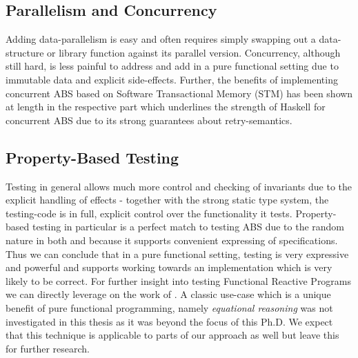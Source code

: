 %
%
%	
%	

\subsection{Parallelism and Concurrency}
Adding data-parallelism is easy and often requires simply swapping out a data-structure or library function against its parallel version. Concurrency, although still hard, is less painful to address and add in a pure functional setting due to immutable data and explicit side-effects. Further, the benefits of implementing concurrent ABS based on Software Transactional Memory (STM) has been shown at length in the respective part which underlines the strength of Haskell for concurrent ABS due to its strong guarantees about retry-semantics. 

\subsection{Property-Based Testing}
Testing in general allows much more control and checking of invariants due to the explicit handling of effects - together with the strong static type system, the testing-code is in full, explicit control over the functionality it tests. Property-based testing in particular is a perfect match to testing ABS due to the random nature in both and because it supports convenient expressing of specifications. Thus we can conclude that in a pure functional setting, testing is very expressive and powerful and supports working towards an implementation which is very likely to be correct. For further insight into testing Functional Reactive Programs we can directly leverage on the work of \cite{perez_testing_2017}. A classic use-case which is a unique benefit of pure functional programming, namely \textit{equational reasoning} was not investigated in this thesis as it was beyond the focus of this Ph.D. We expect that this technique is applicable to parts of our approach as well but leave this for further research.


